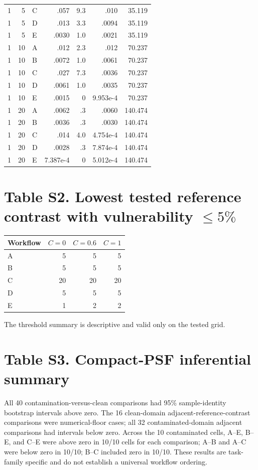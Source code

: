 \documentclass[9pt]{article}
\begin{document}
\begin{longtable}{rrlrrrr}
1&5&C&.057&9.3&.010&35.119\\
1&5&D&.013&3.3&.0094&35.119\\
1&5&E&.0030&1.0&.0021&35.119\\
1&10&A&.012&2.3&.012&70.237\\
1&10&B&.0072&1.0&.0061&70.237\\
1&10&C&.027&7.3&.0036&70.237\\
1&10&D&.0061&1.0&.0035&70.237\\
1&10&E&.0015&0&9.953e-4&70.237\\
1&20&A&.0062&.3&.0060&140.474\\
1&20&B&.0036&.3&.0030&140.474\\
1&20&C&.014&4.0&4.754e-4&140.474\\
1&20&D&.0028&.3&7.874e-4&140.474\\
1&20&E&7.387e-4&0&5.012e-4&140.474\\
\bottomrule\end{longtable}\normalsize
\section*{Table S2. Lowest tested reference contrast with vulnerability $\leq5\%$}
\begin{center}\begin{tabular}{lrrr}\toprule Workflow&$C=0$&$C=0.6$&$C=1$\\\midrule A&5&5&5\\B&5&5&5\\C&20&20&20\\D&5&5&5\\E&1&2&2\\\bottomrule\end{tabular}\end{center}
The threshold summary is descriptive and valid only on the tested grid.
\section*{Table S3. Compact-PSF inferential summary}
All 40 contamination-versus-clean comparisons had 95\% sample-identity bootstrap intervals above zero. The 16 clean-domain adjacent-reference-contrast comparisons were numerical-floor cases; all 32 contaminated-domain adjacent comparisons had intervals below zero. Across the 10 contaminated cells, A--E, B--E, and C--E were above zero in 10/10 cells for each comparison; A--B and A--C were below zero in 10/10; B--C included zero in 10/10. These results are task-family specific and do not establish a universal workflow ordering.
\end{document}
